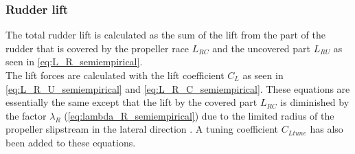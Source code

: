 \subsubsection{Rudder lift}
\label{sec:rudder lift}
The total rudder lift is calculated as the sum of the lift from the part of the rudder that is covered by the propeller race $L_{RC}$ and the uncovered part $L_{RU}$ as seen in \autoref{eq:L_R_semiempirical}.
\begin{equation}
    \label{eq:L_R_semiempirical}
    
\end{equation}
The lift forces are calculated with the lift coefficient $C_L$ as seen in \autoref{eq:L_R_U_semiempirical} and \autoref{eq:L_R_C_semiempirical}. These equations are essentially the same except that the lift by the covered part $L_{RC}$ is diminished by the factor $\lambda_R$ (\autoref{eq:lambda_R_semiempirical}) due to the limited radius of the propeller slipstream in the lateral direction \citep{brix_manoeuvring_1993}. A tuning coefficient $C_{Ltune}$ has also been added to these equations.
\begin{equation}
    \label{eq:L_R_U_semiempirical}
    
\end{equation}
%
\begin{equation}
    \label{eq:L_R_C_semiempirical}
    
\end{equation}

